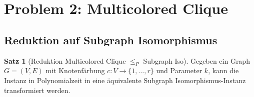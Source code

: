 ﻿\documentclass[a4paper,12pt]{article}
\theoremstyle{definition}
\newtheorem{satz}{Satz}[section]
\begin{document}
\section{Problem 2: Multicolored Clique}

\subsection{Reduktion auf Subgraph Isomorphismus}

\begin{satz}[Reduktion Multicolored Clique $\leq_P$ Subgraph Iso]
	Gegeben ein Graph $G = (V, E)$ mit Knotenfärbung $c: V \to \{1, \ldots, r\}$ und Parameter $k$, kann die Instanz in Polynomialzeit in eine äquivalente Subgraph Isomorphismus-Instanz transformiert werden.
\end{satz}
\end{document}
